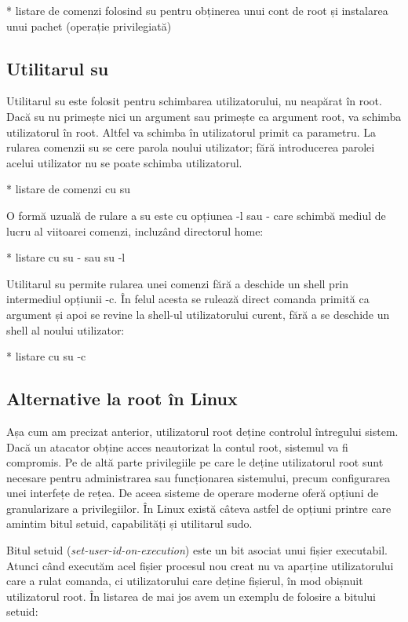 * listare de comenzi folosind su pentru obținerea unui cont de root și instalarea unui pachet (operație privilegiată)

\subsection{Utilitarul su}
\label{sec:users-superuser-su}

Utilitarul su este folosit pentru schimbarea utilizatorului, nu neapărat în
root. Dacă su nu primește nici un argument sau primește ca argument root, va
schimba utilizatorul în root. Altfel va schimba în utilizatorul primit ca
parametru. La rularea comenzii su se cere parola noului utilizator; fără
introducerea parolei acelui utilizator nu se poate schimba utilizatorul.

* listare de comenzi cu su

O formă uzuală de rulare a su este cu opțiunea -l sau - care schimbă mediul de
lucru al viitoarei comenzi, incluzând directorul home:

* listare cu su - sau su -l

Utilitarul su permite rularea unei comenzi fără a deschide un shell prin
intermediul opțiunii -c. În felul acesta se rulează direct comanda primită ca
argument și apoi se revine la shell-ul utilizatorului curent, fără a se deschide
un shell al noului utilizator:

* listare cu su -c

\subsection{Alternative la root în Linux}
\label{sec:users-superuser-altroot}

Așa cum am precizat anterior, utilizatorul root deține controlul întregului
sistem. Dacă un atacator obține acces neautorizat la contul root, sistemul va fi
compromis. Pe de altă parte privilegiile pe care le deține utilizatorul root
sunt necesare pentru administrarea sau funcționarea sistemului, precum
configurarea unei interfețe de rețea. De aceea sisteme de operare moderne oferă
opțiuni de granularizare a privilegiilor. În Linux există câteva astfel de
opțiuni printre care amintim bitul setuid, capabilități și utilitarul sudo.

Bitul setuid (\textit{set-user-id-on-execution}) este un bit asociat unui fișier
executabil. Atunci când executăm acel fișier procesul nou creat nu va aparține
utilizatorului care a rulat comanda, ci utilizatorului care deține fișierul, în
mod obișnuit utilizatorul root. În listarea de mai jos avem un exemplu de
folosire a bitului setuid:


